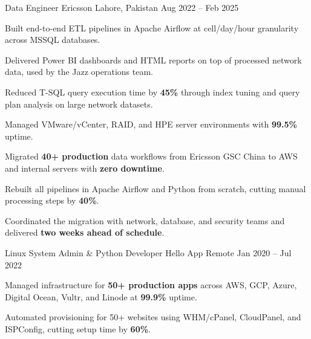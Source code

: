 \documentclass[11pt, a4paper]{awesome-cv}
\begin{document}
\begin{cventries}

  \cventry
    {Data Engineer}
    {Ericsson}
    {Lahore, Pakistan}
    {Aug 2022 -- Feb 2025}
    {
      \begin{cvitems}
        \item {Built end-to-end ETL pipelines in Apache Airflow at cell/day/hour granularity across MSSQL databases.}
        \item {Delivered Power BI dashboards and HTML reports on top of processed network data, used by the Jazz operations team.}
        \item {Reduced T-SQL query execution time by \textbf{45\%} through index tuning and query plan analysis on large network datasets.}
        \item {Managed VMware/vCenter, RAID, and HPE server environments with \textbf{99.5\%} uptime.}
      \end{cvitems}
      \begin{cvitems}
        \item {Migrated \textbf{40+ production} data workflows from Ericsson GSC China to AWS and internal servers with \textbf{zero downtime}.}
        \item {Rebuilt all pipelines in Apache Airflow and Python from scratch, cutting manual processing steps by \textbf{40\%}.}
        \item {Coordinated the migration with network, database, and security teams and delivered \textbf{two weeks ahead of schedule}.}
      \end{cvitems}
    }

  \cventry
    {Linux System Admin \& Python Developer}
    {Hello App}
    {Remote}
    {Jan 2020 -- Jul 2022}
    {
      \begin{cvitems}
        \item {Managed infrastructure for \textbf{50+ production apps} across AWS, GCP, Azure, Digital Ocean, Vultr, and Linode at \textbf{99.9\%} uptime.}
        \item {Automated provisioning for 50+ websites using WHM/cPanel, CloudPanel, and ISPConfig, cutting setup time by \textbf{60\%}.}
      \end{cvitems}
    }


\end{cventries}
\end{document}
